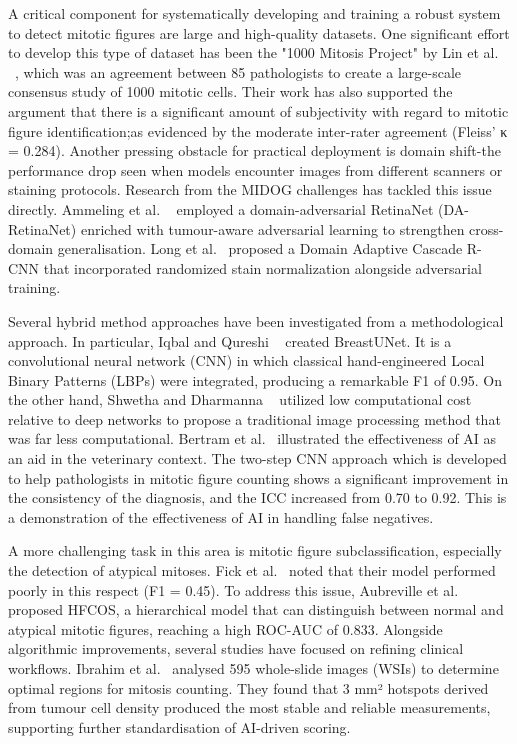 \documentclass[conference]{IEEEtran}
\begin{document}
A critical component for systematically developing and training a robust system to detect mitotic figures are large and high-quality datasets. One significant effort to develop this type of dataset has been the "1000 Mitosis Project" by Lin et al. ~\cite{Lin2024}, which was an agreement between 85 pathologists to create a large-scale consensus study of 1000 mitotic cells. Their work has also supported the argument that there is a significant amount of subjectivity with regard to mitotic figure identification;as evidenced by the moderate inter-rater agreement (Fleiss’ κ = 0.284). Another pressing obstacle for practical deployment is domain shift-the performance drop seen when models encounter images from different scanners or staining protocols. Research from the MIDOG challenges has tackled this issue directly. Ammeling et al. ~\cite{Ammeling2022} employed a domain-adversarial RetinaNet (DA-RetinaNet) enriched with tumour-aware adversarial learning to strengthen cross-domain generalisation. Long et al.~\cite{Long2021} proposed a Domain Adaptive Cascade R-CNN that incorporated randomized stain normalization alongside adversarial training.

Several hybrid method approaches have been investigated from a methodological approach. In particular, Iqbal and Qureshi ~\cite{Iqbal2022} created BreastUNet. It is a convolutional neural network (CNN) in which classical hand-engineered Local Binary Patterns (LBPs) were integrated, producing a remarkable F1 of 0.95. On the other hand, Shwetha and Dharmanna ~\cite{Shwetha2021} utilized low computational cost relative to deep networks to propose a traditional image processing method that was far less computational. Bertram et al.~\cite{Bertram2022} illustrated the effectiveness of AI as an aid in the veterinary context. The two-step CNN approach which is developed to help pathologists in mitotic figure counting shows a significant improvement in the consistency of the diagnosis, and the ICC increased from 0.70 to 0.92. This is a demonstration of the effectiveness of AI in handling false negatives.

A more challenging task in this area is mitotic figure subclassification, especially the detection of atypical mitoses. Fick et al.~\cite{Fick2024} noted that their model performed poorly in this respect (F1 = 0.45). To address this issue, Aubreville et al.~\cite{Aubreville2023} proposed HFCOS, a hierarchical model that can distinguish between normal and atypical mitotic figures, reaching a high ROC-AUC of 0.833. Alongside algorithmic improvements, several studies have focused on refining clinical workflows. Ibrahim et al.~\cite{Ibrahim2022} analysed 595 whole-slide images (WSIs) to determine optimal regions for mitosis counting. They found that 3 mm² hotspots derived from tumour cell density produced the most stable and reliable measurements, supporting further standardisation of AI-driven scoring.
\end{document}
